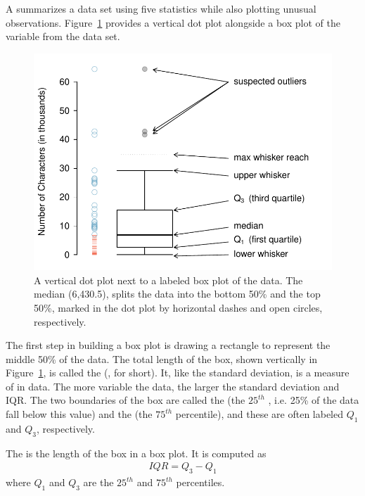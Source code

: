 A  summarizes a data set using five statistics while also plotting unusual observations. Figure~\ref{boxPlotLayoutNumVar} provides a vertical dot plot alongside a box plot of the  variable from the  data set.
\begin{figure}[h]
   \centering
   \includegraphics[width=\mycaptionwidth]{01/figures/boxPlotLayoutNumVar/boxPlotLayoutNumVar} %
   \caption{A vertical dot plot next to a labeled box plot of the  data. The median (6,430.5), splits the data into the bottom 50\% and the top 50\%, marked in the dot plot by horizontal dashes and open circles, respectively.}
   \label{boxPlotLayoutNumVar} %
\end{figure}

The first step in building a box plot is drawing a rectangle to represent the middle 50\% of the data. The total length of the box, shown vertically in Figure~\ref{boxPlotLayoutNumVar}, is called the  (, for short). It, like the standard deviation, is a measure of  in data. The more variable the data, the larger the standard deviation and IQR. The two boundaries of the box are called the   (the $25^{th}$ , i.e. 25\% of the data fall below this value) and the   (the $75^{th}$ percentile), and these are often labeled $Q_1$  and $Q_3$, respectively.

\begin{termBox}{
The  is the length of the box in a box plot. It is computed as
\begin{eqnarray*}
IQR = Q_3 - Q_1
\end{eqnarray*}
where $Q_1$ and $Q_3$ are the $25^{th}$ and $75^{th}$ percentiles.}
\end{termBox}

